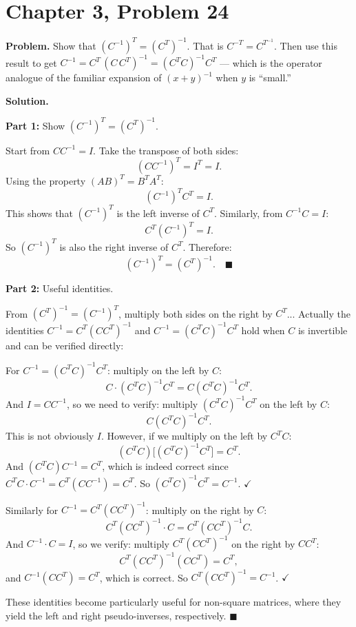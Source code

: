 \documentclass[12pt]{article}
\begin{document}
\section*{Chapter 3, Problem 24}

\textbf{Problem.} Show that $(C^{-1})^T = (C^T)^{-1}$. That is $C^{-T} = C^{T^{-1}}$. Then use this result to get $C^{-1} = C^{T}\,(C\,C^T)^{-1} = (C^T C)^{-1} C^T$ --- which is the operator analogue of the familiar expansion of $(x + y)^{-1}$ when $y$ is ``small.''

\bigskip
\textbf{Solution.}

\textbf{Part 1:} Show $(C^{-1})^T = (C^T)^{-1}$.

Start from $CC^{-1} = I$. Take the transpose of both sides:
\[
(CC^{-1})^T = I^T = I.
\]
Using the property $(AB)^T = B^T A^T$:
\[
(C^{-1})^T C^T = I.
\]
This shows that $(C^{-1})^T$ is the left inverse of $C^T$. Similarly, from $C^{-1}C = I$:
\[
C^T (C^{-1})^T = I.
\]
So $(C^{-1})^T$ is also the right inverse of $C^T$. Therefore:
\[
(C^{-1})^T = (C^T)^{-1}. \quad \blacksquare
\]

\bigskip
\textbf{Part 2:} Useful identities.

From $(C^T)^{-1} = (C^{-1})^T$, multiply both sides on the right by $C^T$... Actually the identities $C^{-1} = C^T(CC^T)^{-1}$ and $C^{-1} = (C^TC)^{-1}C^T$ hold when $C$ is invertible and can be verified directly:

For $C^{-1} = (C^T C)^{-1}C^T$: multiply on the left by $C$:
\[
C \cdot (C^T C)^{-1}C^T = C(C^T C)^{-1}C^T.
\]
And $I = CC^{-1}$, so we need to verify: multiply $(C^TC)^{-1}C^T$ on the left by $C$:
\[
C(C^TC)^{-1}C^T.
\]
This is not obviously $I$. However, if we multiply on the left by $C^TC$:
\[
(C^TC)\bigl[(C^TC)^{-1}C^T\bigr] = C^T.
\]
And $(C^TC) C^{-1} = C^T$, which is indeed correct since $C^T C \cdot C^{-1} = C^T (CC^{-1}) = C^T$. So $(C^TC)^{-1}C^T = C^{-1}$. $\checkmark$

Similarly for $C^{-1} = C^T(CC^T)^{-1}$: multiply on the right by $C$:
\[
C^T(CC^T)^{-1} \cdot C = C^T(CC^T)^{-1}C.
\]
And $C^{-1}\cdot C = I$, so we verify: multiply $C^T(CC^T)^{-1}$ on the right by $CC^T$:
\[
C^T(CC^T)^{-1}(CC^T) = C^T,
\]
and $C^{-1}(CC^T) = C^T$, which is correct. So $C^T(CC^T)^{-1} = C^{-1}$. $\checkmark$

These identities become particularly useful for non-square matrices, where they yield the left and right pseudo-inverses, respectively. \hfill $\blacksquare$
\end{document}
